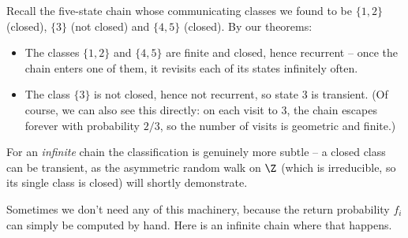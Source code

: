 \documentclass[a4paper]{scrartcl}
\begin{document}
\begin{example}
	Recall the five-state chain whose communicating classes we found to be $\{1, 2\}$ (closed), $\{3\}$ (not closed) and $\{4, 5\}$ (closed). By our theorems:
	\begin{itemize}
		\item The classes $\{1, 2\}$ and $\{4, 5\}$ are finite and closed, hence recurrent -- once the chain enters one of them, it revisits each of its states infinitely often.
		\item The class $\{3\}$ is not closed, hence not recurrent, so state 3 is transient. (Of course, we can also see this directly: on each visit to 3, the chain escapes forever with probability $2/3$, so the number of visits is geometric and finite.)
	\end{itemize}
	For an \emph{infinite} chain the classification is genuinely more subtle -- a closed class can be transient, as the asymmetric random walk on $\Z$ (which is irreducible, so its single class is closed) will shortly demonstrate.
\end{example}

Sometimes we don't need any of this machinery, because the return probability $f_i$ can simply be computed by hand. Here is an infinite chain where that happens.
\end{document}
